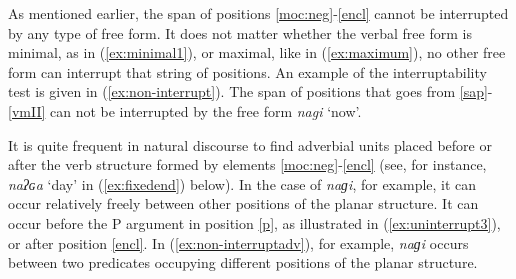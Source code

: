 \documentclass[output=paper]{langscibook}
\begin{document}
As mentioned earlier, the span of positions \ref{moc:neg}-\ref{encl} cannot be interrupted by any type of free form. It does not matter whether the verbal free form is minimal, as in (\ref{ex:minimal1}), or maximal, like in (\ref{ex:maximum}), no other free form can interrupt that string of positions. An example of the interruptability test is given in (\ref{ex:non-interrupt}). The span of positions that goes from \ref{sap}-\ref{vmII} can not be interrupted by the free form \textit{nagi} `now'. 

\ea \label{ex:non-interrupt}
 \label{ex:uninterrupt1}
\label{ex:uninterrupt2}
	\label{ex:uninterrupt3}
\z
\z

 It is quite frequent in natural discourse to find adverbial units placed before or after the verb structure formed by elements \ref{moc:neg}-\ref{encl} (see, for instance, \textit{naʔɢa} `day' in (\ref{ex:fixedend}) below). In the case of \textit{naɡi}, for example, it  can occur relatively freely between other positions of the planar structure. It can occur before the P argument in position \ref{p}, as illustrated in (\ref{ex:uninterrupt3}), or after position \ref{encl}.  In (\ref{ex:non-interruptadv}), for example, \textit{naɡi} occurs between two predicates occupying different positions of the planar structure. 
    
\end{document}
